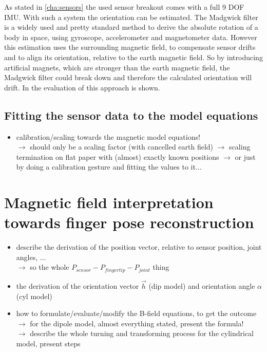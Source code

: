 As stated in \ref{cha:sensors} the used sensor breakout comes with a full 9 \ac{DOF} \ac{IMU}. With such a system the orientation can be estimated. The Madgwick filter \cite{madgwick2010efficient} is a widely used and pretty standard method to derive the absolute rotation of a body in space, using gyroscope, accelerometer and magnetometer data. However this estimation uses the surrounding magnetic field, to compensate sensor drifts and to align its orientation, relative to the earth magnetic field. So by introducing artificial magnets, which are stronger than the earth magnetic field, the Madgwick filter could break down and therefore the calculated orientation will drift. In  the evaluation of this approach is shown.


\subsection{Fitting the sensor data to the model equations}

\begin{itemize}
\item calibration/scaling towards the magnetic model equations! \\
		$ \rightarrow $ should only be a scaling factor (with cancelled earth field)
		$ \rightarrow $ scaling termination on flat paper with (almost) exactly known positions		
		$ \rightarrow $ or just by doing a calibration gesture and fitting the values to it...
\end{itemize}
		




\section{Magnetic field interpretation towards finger pose reconstruction} \label{sec:magmodel}

\begin{itemize}
\item describe the derivation of the position vector, relative to sensor position, joint angles, ... \\
		$ \rightarrow $ so the whole $ P_{sensor} - P_{fingertip} - P_{joint} $ thing
\item the derivation of the orientation vector $ \vec{h} $ (dip model) and orientation angle $ \alpha $ (cyl model)
\item how to formulate/evaluate/modify the B-field equations, to get the outcome\\
		$ \rightarrow $ for the dipole model, almost everything stated, present the formula! \\
		$ \rightarrow $ describe the whole turning and transforming process for the cylindrical model, present steps
		
\end{itemize}		


